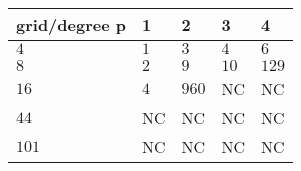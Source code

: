\begin{tabular}{lllll}
\hline
 grid/degree p   & 1   & 2     & 3    & 4     \\
\hline
 $4$             & $1$ & $3$   & $4$  & $6$   \\
 $8$             & $2$ & $9$   & $10$ & $129$ \\
 $16$            & $4$ & $960$ & NC   & NC    \\
 $44$            & NC  & NC    & NC   & NC    \\
 $101$           & NC  & NC    & NC   & NC    \\
\hline
\end{tabular}